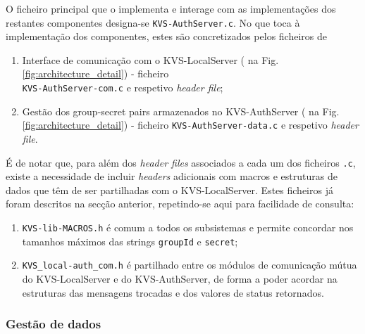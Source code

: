 O ficheiro principal que o implementa e interage com as implementações dos restantes componentes designa-se \texttt{KVS-AuthServer.c}. No que toca à implementação dos componentes, estes são concretizados pelos ficheiros de
\begin{enumerate}[noitemsep]
\item Interface de comunicação com o KVS-LocalServer ( na Fig. \ref{fig:architecture_detail}) - ficheiro \\ \texttt{KVS-AuthServer-com.c} e respetivo \textit{header file};
\item Gestão dos group-secret pairs armazenados no KVS-AuthServer ( na Fig. \ref{fig:architecture_detail}) - ficheiro \texttt{KVS-AuthServer-data.c} e respetivo \textit{header file}.
\end{enumerate}
É de notar que, para além dos \textit{header files} associados a cada um dos ficheiros \texttt{.c}, existe a necessidade de incluir \textit{headers} adicionais com macros e estruturas de dados que têm de ser partilhadas com o KVS-LocalServer. Estes ficheiros já foram descritos na secção anterior, repetindo-se aqui para facilidade de consulta:
\begin{enumerate}[noitemsep]
\item \texttt{KVS-lib-MACROS.h} é comum a todos os subsistemas e permite concordar nos tamanhos máximos das strings \texttt{groupId} e \texttt{secret};
\item \texttt{KVS\_local-auth\_com.h} é partilhado entre os módulos de comunicação mútua do KVS-LocalServer e do KVS-AuthServer, de forma a poder acordar na estruturas das mensagens trocadas e dos valores de status retornados.
\end{enumerate}

\subsubsection{Gestão de dados}

